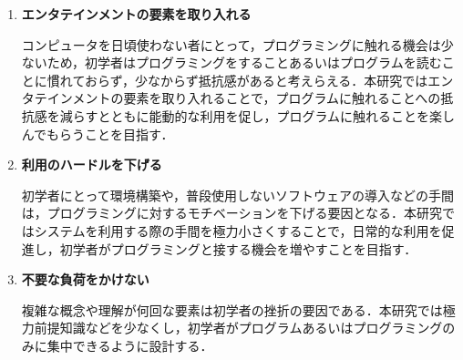 \begin{enumerate}
  \item {\bf エンタテインメントの要素を取り入れる}

  コンピュータを日頃使わない者にとって，プログラミングに触れる機会は少ないため，初学者はプログラミングをすることあるいはプログラムを読むことに慣れておらず，少なからず抵抗感があると考えらえる．本研究ではエンタテインメントの要素を取り入れることで，プログラムに触れることへの抵抗感を減らすとともに能動的な利用を促し，プログラムに触れることを楽しんでもらうことを目指す．

  \item {\bf 利用のハードルを下げる}

  初学者にとって環境構築や，普段使用しないソフトウェアの導入などの手間は，プログラミングに対するモチベーションを下げる要因となる．本研究ではシステムを利用する際の手間を極力小さくすることで，日常的な利用を促進し，初学者がプログラミングと接する機会を増やすことを目指す．

  \item {\bf 不要な負荷をかけない}

  複雑な概念や理解が何回な要素は初学者の挫折の要因である．本研究では極力前提知識などを少なくし，初学者がプログラムあるいはプログラミングのみに集中できるように設計する．
\end{enumerate}